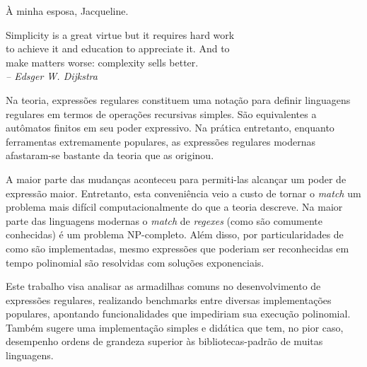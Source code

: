 \documentclass[a4paper,12pt,oneside,onecolumn]{uerj}
\begin{document}
\renewcommand*{\lstlistingname}{Listagem}
\frontmatter
\capa
\folhaderosto

%

\begin{folhadeaprovacao}
\end{folhadeaprovacao}


  \vfill\vfill
    \hfill À minha esposa, Jacqueline.
  \vfill


\pretextualchapter{}

  \vfill\vfill\vfill\vfill
  \begin{flushright}
     Simplicity is a great virtue but it requires hard work\\
     to achieve it and education to appreciate it. And to \\
     make matters worse: complexity sells better.\\
    \textsl{-- Edsger W. Dijkstra}
  \end{flushright}
  \vfill




Na teoria, expressões regulares constituem uma notação para definir linguagens regulares em termos de operações recursivas simples. São equivalentes a autômatos finitos em seu poder expressivo. Na prática entretanto, enquanto ferramentas extremamente populares, as expressões regulares modernas afastaram-se bastante da teoria que as originou. 

A maior parte das mudanças aconteceu para permiti-las alcançar um poder de expressão maior. Entretanto, esta conveniência veio a custo de tornar o \emph{match} um problema mais difícil computacionalmente do que a teoria descreve. Na maior parte das linguagens modernas o \emph{match} de \emph{regexes} (como são comumente conhecidas) é um problema NP-completo. Além disso, por particularidades de como são implementadas, mesmo expressões que poderiam ser reconhecidas em tempo polinomial são resolvidas com soluções exponenciais. 

Este trabalho visa analisar as armadilhas comuns no desenvolvimento de expressões regulares, realizando benchmarks entre diversas implementações populares, apontando funcionalidades que impediriam sua execução polinomial. Também sugere uma implementação simples e didática que tem, no pior caso, desempenho ordens de grandeza superior às bibliotecas-padrão de muitas linguagens.
\end{document}
